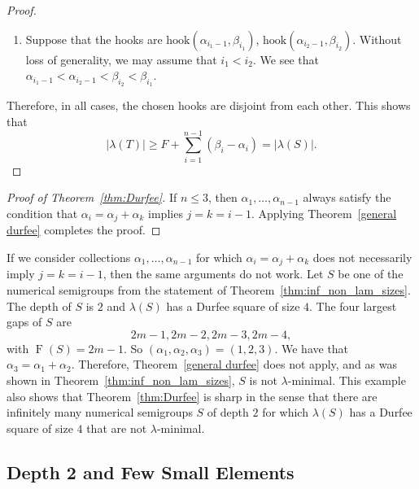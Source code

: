 \documentclass{amsproc}
\DeclareMathOperator{\F}{F}
\newcommand{\hook}{\text{hook}}
\theoremstyle{definition}
\theoremstyle{remark}
\numberwithin{equation}{section}
\begin{document}
\begin{proof}
\begin{enumerate}
    We first consider the sub-case where $i_2<i_1$. Then we have $\alpha_{i_2-1}<\alpha_{i_1}<\beta_{i_1}<\beta_{i_2}$.

    Next, consider the sub-case where $i_2>i_1$. Since $i_2-i_1\neq 1$, this implies $i_2-1>i_1$. In this case, we have $\alpha_{i_1}<\alpha_{i_2-1}<\beta_{i_2}<\beta_{i_1}$.

    \item Suppose that the hooks are $\hook(\alpha_{i_1-1},\beta_{i_1})$, $\hook(\alpha_{i_2-1},\beta_{i_2})$.
    Without loss of generality, we may assume that $i_1<i_2$. We see that $\alpha_{i_1-1}<\alpha_{i_2-1}<\beta_{i_2}<\beta_{i_1}$.
\end{enumerate}
Therefore, in all cases, the chosen hooks are disjoint from each other.
This shows that 
\[|\lambda(T)|\geq F+\sum\limits_{i=1}^{n-1}(\beta_i-\alpha_i)=|\lambda(S)|.\]
\end{proof}

\begin{proof}[Proof of Theorem~\ref{thm:Durfee}]
If $n\leq 3$, then $\alpha_1,\dots,\alpha_{n-1}$ always satisfy the condition that $\alpha_i=\alpha_j+\alpha_k$ implies $j=k=i-1$. Applying Theorem~\ref{general durfee} completes the proof.
\end{proof}

If we consider collections $\alpha_1,\ldots, \alpha_{n-1}$ for which $\alpha_i=\alpha_j+\alpha_k$ does not necessarily imply $j=k=i-1$, then the same arguments do not work. Let $S$ be one of the numerical semigroups from the statement of Theorem~\ref{thm:inf_non_lam_sizes}. The depth of $S$ is $2$ and $\lambda(S)$ has a Durfee square of size $4$.  The four largest gaps of $S$ are
\[
2m-1,2m-2,2m-3,2m-4, 
\]
with $\F(S) = 2m-1$. So $(\alpha_1, \alpha_2, \alpha_3)=(1,2,3)$. We have that $\alpha_3=\alpha_1+\alpha_2$. Therefore, Theorem~\ref{general durfee} does not apply, and as was shown in Theorem~\ref{thm:inf_non_lam_sizes}, $S$ is not $\lambda$-minimal. This example also shows that Theorem~\ref{thm:Durfee} is sharp in the sense that there are infinitely many numerical semigroups $S$ of depth $2$ for which $\lambda(S)$ has a Durfee square of size $4$ that are not $\lambda$-minimal.








\subsection{Depth 2 and Few Small Elements}
\end{document}

